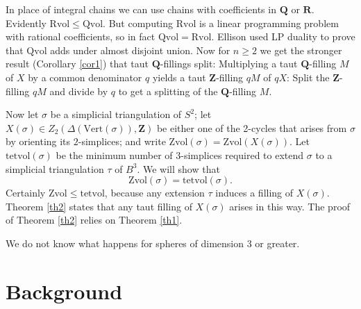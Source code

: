 \documentclass[12pt]{article}
\def\ZZ{\mathbf{Z}}
\def\QQ{\mathbf{Q}}
\def\RR{\mathbf{R}}
\def\del{\partial}
\newcommand{\kw}{\mathrm}
\newcommand{\vertices}{\kw{Vert}}
\newcommand{\Zvol}{\kw{Zvol}}
\newcommand{\Qvol}{\kw{Qvol}}
\newcommand{\Rvol}{\kw{Rvol}}
\newcommand{\tetvol}{\kw{tetvol}}
\begin{document}
In place of integral chains we can use chains with
coefficients in $\QQ$ or $\RR$.
Evidently $\Rvol \leq \Qvol$.
But computing $\Rvol$ is
a linear programming problem with rational coefficients,
so in fact $\Qvol = \Rvol$.
Ellison used LP duality to prove that
$\Qvol$ adds under almost
disjoint union.
Now for $n \geq 2$ we get the stronger result
(Corollary \ref{cor1})
that taut $\QQ$-fillings split:
Multiplying a taut
$\QQ$-filling $M$ of $X$ by a common denominator $q$
yields a taut $\ZZ$-filling $qM$ of $qX$:
Split the $\ZZ$-filling $qM$ and divide by $q$ to get a splitting
of the $\QQ$-filling $M$.

Now let $\sigma$ be a simplicial triangulation of $S^2$;
let $X(\sigma) \in Z_2(\Delta(\vertices(\sigma)),\ZZ)$
be either one of the 2-cycles
that arises from $\sigma$ by orienting its $2$-simplices;
and write $\Zvol(\sigma) = \Zvol(X(\sigma))$.
Let $\tetvol(\sigma)$ be the minimum number of $3$-simplices
required to extend $\sigma$ to a simplicial triangulation $\tau$ of $B^3$.
We will show that
\[
\Zvol(\sigma) = \tetvol(\sigma)
.
\]
Certainly $\Zvol \leq \tetvol$,
because any extension $\tau$ induces a filling
of $X(\sigma)$.
Theorem \ref{th2} states that 
any taut filling of $X(\sigma)$ arises in this way.
The proof of Theorem \ref{th2} relies on Theorem \ref{th1}.

We do not know what happens for spheres of dimension 3 or greater.

\section{Background}
\end{document}
